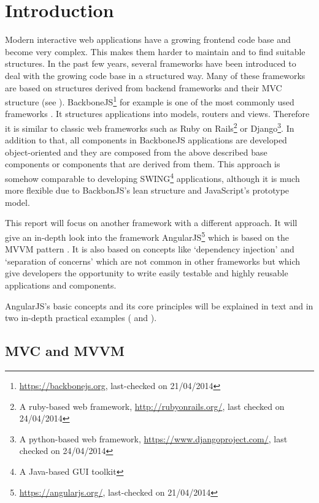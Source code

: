 \chapter{Introduction}
\label{ch:introduction}

Modern interactive web applications have a growing frontend code base and become very complex. This makes them harder to maintain and to find suitable structures. In the past few years, several frameworks have been introduced to deal with the growing code base in a structured way. Many of these frameworks are based on structures derived from backend frameworks and their MVC structure (see ). BackboneJS\footnote{\url{https://backbonejs.org}, last-checked on 21/04/2014} for example is one of the most commonly used frameworks \cite{sanderson2012rich}. It structures applications into models, routers and views. Therefore it is similar to classic web frameworks such as Ruby on Rails\footnote{A ruby-based web framework, \url{http://rubyonrails.org/}, last checked on 24/04/2014} or Django\footnote{A python-based web framework, \url{https://www.djangoproject.com/}, last checked on 24/04/2014}. In addition to that, all components in BackboneJS applications are developed object-oriented and they are composed from the above described base components or components that are derived from them. This approach is somehow comparable to developing SWING\footnote{A Java-based GUI toolkit} applications, although it is much more flexible due to BackbonJS's lean structure and JavaScript's prototype model.

This report will focus on another framework with a different approach. It will give an in-depth look into the framework AngularJS\footnote{\url{https://angularjs.org/}, last-checked on 21/04/2014} which is based on the MVVM pattern \cite{minar2012mvvm}. It is also based on concepts like `dependency injection' and `separation of concerns' which are not common in other frameworks but which give developers the opportunity to write easily testable and highly reusable applications and components.

AngularJS's basic concepts and its core principles will be explained in text and in two in-depth practical examples ( and ). 

\section{MVC and MVVM}
\label{sec:mvcmvvm}

